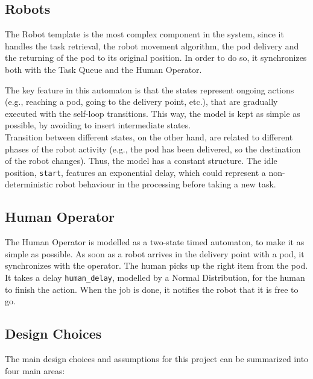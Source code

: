 \subsection{Robots}
The Robot template is the most complex component in the system, since it handles the task retrieval, the robot movement algorithm, the pod delivery and the returning of the pod to its original position.
In order to do so, it synchronizes both with the Task Queue and the Human Operator. 

The key feature in this automaton is that the states represent ongoing actions (e.g., reaching a pod, going to the delivery point, etc.), that are gradually executed with the self-loop transitions. This way, the model is kept as simple as possible, by avoiding to insert intermediate states. \\
Transition between different states, on the other hand, are related to different phases of the robot activity (e.g., the pod has been delivered, so the destination of the robot changes). Thus, the model has a constant structure. 
The idle position, \texttt{start}, features an exponential delay, which could represent a non-deterministic robot behaviour in the processing before taking a new task.

\subsection{Human Operator}	
The Human Operator is modelled as a two-state timed automaton, to make it as simple as possible. As soon as a robot arrives in the delivery point with a pod, it synchronizes with the operator. The human picks up the right item from the pod. It takes a delay \texttt{human\_delay}, modelled by a Normal Distribution, for the human to finish the action. When the job is done, it notifies the robot that it is free to go. 

\subsection{Design Choices}
The main design choices and assumptions for this project can be summarized into four main areas:

